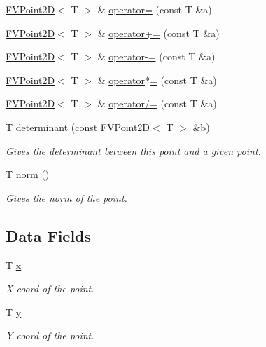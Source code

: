 \begin{DoxyCompactItemize}
\hyperlink{classFVL_1_1FVPoint2D}{FVPoint2D}$<$ T $>$ \& \hyperlink{classFVL_1_1FVPoint2D_a5948ae8fb36fe09097368c3a1f6e9552}{operator=} (const T \&a)
\item 
\hyperlink{classFVL_1_1FVPoint2D}{FVPoint2D}$<$ T $>$ \& \hyperlink{classFVL_1_1FVPoint2D_a16fff943537377470b4bd79d2deffd5e}{operator+=} (const T \&a)
\item 
\hyperlink{classFVL_1_1FVPoint2D}{FVPoint2D}$<$ T $>$ \& \hyperlink{classFVL_1_1FVPoint2D_af036aa6ae3725f65c4aa7e078ab48836}{operator-\/=} (const T \&a)
\item 
\hyperlink{classFVL_1_1FVPoint2D}{FVPoint2D}$<$ T $>$ \& \hyperlink{classFVL_1_1FVPoint2D_a06b505f300f4d7f0b5c085c12bf1ed2c}{operator$\ast$=} (const T \&a)
\item 
\hyperlink{classFVL_1_1FVPoint2D}{FVPoint2D}$<$ T $>$ \& \hyperlink{classFVL_1_1FVPoint2D_a9c3671200517df046464be3675ef81ee}{operator/=} (const T \&a)
\item 
T \hyperlink{classFVL_1_1FVPoint2D_a08a09a9d48ae528b1039626edc81c8e7}{determinant} (const \hyperlink{classFVL_1_1FVPoint2D}{FVPoint2D}$<$ T $>$ \&b)
\begin{DoxyCompactList}\small\item\em Gives the determinant between this point and a given point. \item\end{DoxyCompactList}\item 
T \hyperlink{classFVL_1_1FVPoint2D_af24be80b084aba7457ceb3151d230575}{norm} ()
\begin{DoxyCompactList}\small\item\em Gives the norm of the point. \item\end{DoxyCompactList}\end{DoxyCompactItemize}
\subsection*{Data Fields}
\begin{DoxyCompactItemize}
\item 
T \hyperlink{classFVL_1_1FVPoint2D_a9a4f74af87a76a4c3dcb729cb0e68f8d}{x}
\begin{DoxyCompactList}\small\item\em X coord of the point. \item\end{DoxyCompactList}\item 
T \hyperlink{classFVL_1_1FVPoint2D_a1cb2b5ea04251d543e49356ef54eb853}{y}
\begin{DoxyCompactList}\small\item\em Y coord of the point. \item\end{DoxyCompactList}\end{DoxyCompactItemize}


